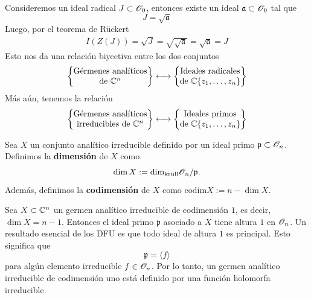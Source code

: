 \begin{remark}
	Consideremos un ideal radical $J\subset\mathscr{O}_0$, entonces existe un ideal $\mathfrak{a}\subset\mathscr{O}_0$ tal que
	\begin{equation*}
		J=\sqrt{\mathfrak{a}}
	\end{equation*}
	Luego, por el teorema de Rückert
	\begin{align*}
		I(Z(J))=\sqrt{J}=\sqrt{\sqrt{\mathfrak{a}}}=\sqrt{\mathfrak{a}}=J
	\end{align*}
	Esto nos da una relación biyectiva entre los dos conjuntos
	\begin{align*}
		\begin{Bmatrix}
			\text{Gérmenes analíticos}\\
			\text{de }\mathbb{C}^n
		\end{Bmatrix}\longleftrightarrow\begin{Bmatrix}
			\text{Ideales radicales}\\
			\text{de }\mathbb{C}\{z_1,\dots,z_n\}
		\end{Bmatrix}
	\end{align*}
	Más aún, tenemos la relación
	\begin{align*}
		\begin{Bmatrix}
			\text{Gérmenes analíticos}\\
			\text{irreducibles de }\mathbb{C}^n
		\end{Bmatrix}\longleftrightarrow\begin{Bmatrix}
			\text{Ideales primos}\\
			\text{de }\mathbb{C}\{z_1,\dots,z_n\}
		\end{Bmatrix}
	\end{align*}
\end{remark}

\begin{definition}
	Sea $X$ un conjunto analítico irreducible definido por un ideal primo $\mathfrak{p}\subset\mathscr{O}_n$. Definimos la \textbf{dimensión} de $X$ como
	\begin{equation*}
		\dim X:=\mathrm{dim}_{\text{krull}}\mathscr{O}_n/\mathfrak{p}.
	\end{equation*}
	Además, definimos la \textbf{codimensión} de $X$ como $\mathrm{codim}X:=n-\dim X$.
\end{definition}

Sea $X\subset\mathbb{C}^n$ un germen analítico irreducible de codimensión $1$, es decir, $\dim X=n-1$. Entonces el ideal primo $\mathfrak{p}$ asociado a $X$ tiene altura $1$ en $\mathscr{O}_n$. Un resultado esencial de los DFU es que todo ideal de altura $1$ es principal. Esto significa que 
\begin{equation*}
	\mathfrak{p}=\langle f \rangle 
\end{equation*}
para algún elemento irreducible $f\in\mathscr{O}_n$. Por lo tanto, un germen analítico irreducible de codimensión uno está definido por una función holomorfa irreducible.

